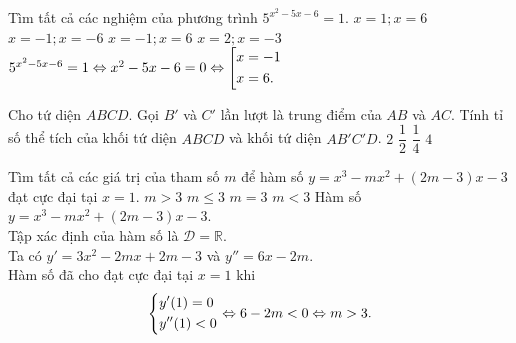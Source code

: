 \begin{ex}%
 Tìm tất cả các nghiệm của phương trình $5^{x^2-5x-6} = 1$.
 \choice
  {$x = 1; x = 6$}
  {$x = -1; x = -6$}
  {\True $x = -1; x = 6$}
  {$x = 2; x = -3$}
 \loigiai
  {
  $5^{x^2-5x-6} = 1 \Leftrightarrow x^2 - 5x - 6 = 0 \Leftrightarrow \left[\begin{aligned}& x = -1 \\& x = 6.\end{aligned}\right.$
  }
\end{ex}

\begin{ex}%
 Cho tứ diện $ABCD$. Gọi $B'$ và $C'$ lần lượt là trung điểm của $AB$ và $AC$. Tính tỉ số thể tích của khối tứ diện $ABCD$ và khối tứ diện $AB'C'D$.
 \choice
  {$2$}
  {$\dfrac{1}{2}$}
  {$\dfrac{1}{4}$}
  {\True $4$}
 \loigiai
  {
  {
  }
  }
\end{ex}

\begin{ex}%
 Tìm tất cả các giá trị của tham số $m$ để hàm số $y = x^3 - mx^2 + (2m-3)x - 3$ đạt cực đại tại $x = 1$.
 \choice
  {\True $m > 3$}
  {$m \leq 3$}
  {$m = 3$}
  {$m < 3$}
 \loigiai
  {
  Hàm số $y = x^3 - mx^2 + (2m-3)x - 3$.\\
  Tập xác định của hàm số là $\mathscr{D} = \mathbb{R}$.\\
  Ta có $y' = 3x^2 - 2mx + 2m - 3$ và $y'' = 6x - 2m$.\\
  Hàm số đã cho đạt cực đại tại $x = 1$ khi
  \begin{eqnarray*}
   \left\{\begin{aligned}& y'(1) = 0 \\& y''(1) < 0\end{aligned}\right. \Leftrightarrow 6 - 2m < 0 \Leftrightarrow m > 3.
  \end{eqnarray*}
  }
\end{ex}

